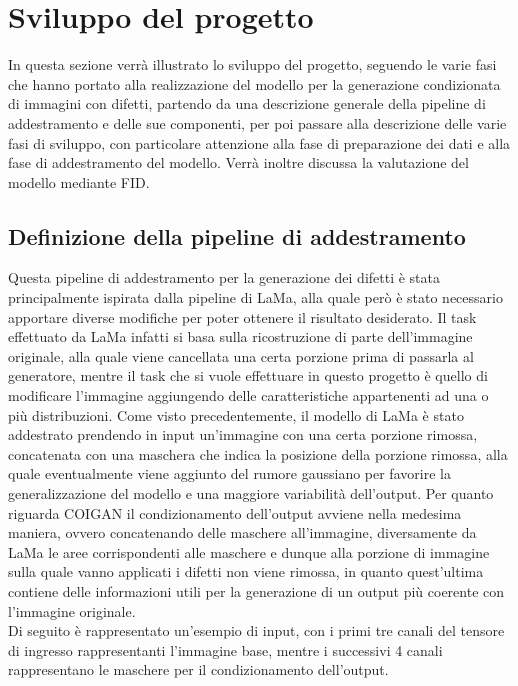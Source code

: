 \chapter{Sviluppo del progetto}
In questa sezione verrà illustrato lo sviluppo del progetto, seguendo le varie fasi che hanno portato alla realizzazione del modello
per la generazione condizionata di immagini con difetti, partendo da una descrizione generale della pipeline di addestramento
e delle sue componenti, per poi passare alla descrizione delle varie fasi di sviluppo, con particolare attenzione alla fase di
preparazione dei dati e alla fase di addestramento del modello. Verrà inoltre discussa la valutazione del modello mediante FID. 

\section{Definizione della pipeline di addestramento}

Questa pipeline di addestramento per la generazione dei difetti è stata principalmente ispirata dalla pipeline di LaMa, alla quale però
è stato necessario apportare diverse modifiche per poter ottenere il risultato desiderato.
Il task effettuato da LaMa infatti si basa sulla ricostruzione di parte dell'immagine originale, alla quale viene cancellata una certa porzione prima di passarla
al generatore, mentre il task che si vuole effettuare in questo progetto è quello di modificare l'immagine aggiungendo delle caratteristiche
appartenenti ad una o più distribuzioni. Come visto precedentemente, il modello di LaMa è stato addestrato
prendendo in input un'immagine con una certa porzione rimossa, concatenata con una maschera che indica la posizione della porzione rimossa,
alla quale eventualmente viene aggiunto del rumore gaussiano per favorire la generalizzazione del modello e una maggiore variabilità dell'output.
Per quanto riguarda COIGAN il condizionamento dell'output avviene nella medesima maniera, ovvero concatenando delle maschere all'immagine,
diversamente da LaMa le aree corrispondenti alle maschere e dunque alla porzione di immagine sulla quale vanno applicati i difetti non viene rimossa, 
in quanto quest'ultima contiene delle informazioni utili per la generazione di un output più coerente con l'immagine originale.\\
Di seguito è rappresentato un'esempio di input, con i primi tre canali del tensore di ingresso rappresentanti l'immagine base,
mentre i successivi 4 canali rappresentano le maschere per il condizionamento dell'output.\\

